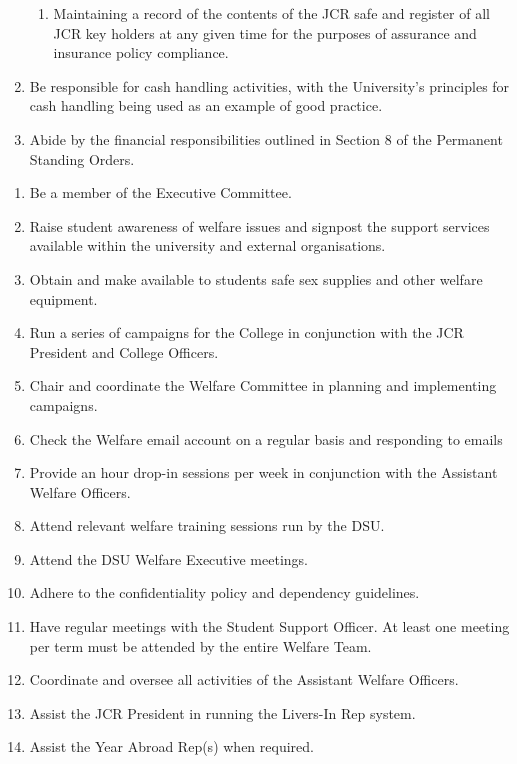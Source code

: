 \begin{enumerate}
\begin{enumerate}
            \item Maintaining a record of the contents of the JCR safe and register of all JCR key holders at any given time for the purposes of assurance and insurance policy compliance.
        \end{enumerate}
    \item Be responsible for cash handling activities, with the University’s principles for cash handling being used as an example of good practice.
    \item Abide by the financial responsibilities outlined in Section 8 of the Permanent Standing Orders. %
\end{enumerate}

\begin{enumerate}
    \item Be a member of the Executive Committee.
    \item Raise student awareness of welfare issues and signpost the support services available within the university and external organisations.
    \item Obtain and make available to students safe sex supplies and other welfare equipment.
    \item Run a series of campaigns for the College in conjunction with the JCR President and College Officers. 
    \item Chair and coordinate the Welfare Committee in planning and implementing campaigns.  
    \item Check the Welfare email account on a regular basis and responding to emails
    \item Provide an hour drop-in sessions per week in conjunction with the Assistant Welfare Officers.
    \item Attend relevant welfare training sessions run by the DSU.
    \item Attend the DSU Welfare Executive meetings.
    \item Adhere to the confidentiality policy and dependency guidelines.
    \item Have regular meetings with the Student Support Officer. At least one meeting per term must be attended by the entire Welfare Team.
    \item Coordinate and oversee all activities of the Assistant Welfare Officers.
    \item Assist the JCR President in running the Livers-In Rep system.
    \item Assist the Year Abroad Rep(s) when required.

\end{enumerate}
